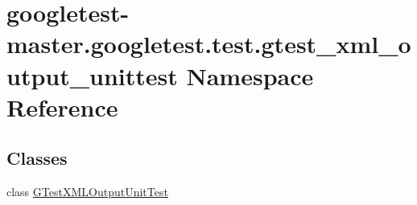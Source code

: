 \hypertarget{namespacegoogletest-master_1_1googletest_1_1test_1_1gtest__xml__output__unittest}{}\section{googletest-\/master.googletest.\+test.\+gtest\+\_\+xml\+\_\+output\+\_\+unittest Namespace Reference}
\label{namespacegoogletest-master_1_1googletest_1_1test_1_1gtest__xml__output__unittest}
\subsection*{Classes}
\begin{DoxyCompactItemize}
\item 
class \mbox{\hyperlink{classgoogletest-master_1_1googletest_1_1test_1_1gtest__xml__output__unittest_1_1_g_test_x_m_l_output_unit_test}{G\+Test\+X\+M\+L\+Output\+Unit\+Test}}
\end{DoxyCompactItemize}
